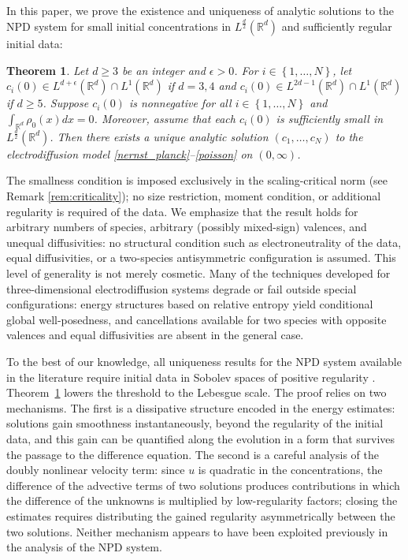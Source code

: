 \documentclass[11pt,reqno]{amsart}
\newtheorem{thm}{Theorem}[section]
\newcommand{\R}{\mathbb R}
\begin{document}
In this paper, we prove the existence and uniqueness of analytic solutions to the NPD system for small initial concentrations in $L^{\frac{d}{2}}(\R^d)$ and sufficiently regular initial data:

\begin{thm} \label{extension}
Let $d \ge 3$ be an integer and $\epsilon > 0$. For $i \in \left\{1, \dots, N \right\}$, let $c_i(0) \in L^{d+\epsilon}(\R^d) \cap L^1(\R^d)$ if $d = 3,4$ and   $c_i(0) \in L^{2d-1}(\R^d) \cap L^1(\R^d)$ if $d \ge 5$. Suppose $c_i(0)$ is nonnegative for all $i \in \left\{1, \dots, N \right\}$ and $\int_{\R^d} \rho_0(x) dx = 0$. Moreover, assume that each $c_i(0)$ is sufficiently small in $L^{\frac{d}{2}}(\R^d)$. Then there exists a unique analytic solution $(c_1, \dots, c_N)$ to the electrodiffusion model \eqref{nernst_planck}--\eqref{poisson} on $(0, \infty)$. 
\end{thm} 

The smallness condition  is imposed exclusively in
the scaling-critical norm (see Remark \ref{rem:criticality}); no size restriction, moment condition, or
additional regularity is required of the data. We emphasize that the
result holds for arbitrary numbers of species, arbitrary (possibly
mixed-sign) valences, and unequal diffusivities: no structural
condition such as electroneutrality of the data, equal diffusivities,
or a two-species antisymmetric configuration is assumed. This level of
generality is not merely cosmetic. Many of the techniques developed
for three-dimensional electrodiffusion systems degrade or fail outside special
configurations: energy structures based on relative entropy yield conditional global well-posedness, and cancellations
available for two species with opposite valences and equal
diffusivities are absent in the general case. 

To the best of our knowledge, all uniqueness results for the NPD
system available in the literature require initial data in Sobolev
spaces of positive regularity \cite{abdo2025long, abdo2026long, ignatova2022global}. Theorem~\ref{extension} lowers the
threshold to the Lebesgue scale. The proof relies on two mechanisms.
The first is a dissipative structure encoded in the energy estimates:
solutions gain smoothness instantaneously, beyond the regularity of
the initial data, and this gain can be quantified along the evolution
in a form that survives the passage to the difference equation. The
second is a careful analysis of the doubly nonlinear velocity term:
since $u$ is quadratic in the concentrations, the difference of the
advective terms of two solutions produces contributions in which the
difference of the unknowns is multiplied by low-regularity factors;
closing the estimates requires distributing the gained regularity
asymmetrically between the two solutions. Neither mechanism appears
to have been exploited previously in the analysis of the NPD system.
\end{document}
